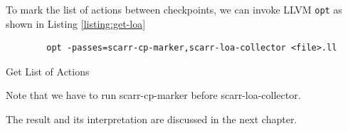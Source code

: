 To mark the list of actions between checkpoints, we can invoke LLVM \texttt{opt} as shown in Listing \ref{listing:get-loa}

\begin{listing}
    \begin{verbatim}
        opt -passes=scarr-cp-marker,scarr-loa-collector <file>.ll
    \end{verbatim}
    \caption{Get List of Actions}    
    \label{listing:get-loa}
\end{listing}

Note that we have to run scarr-cp-marker before scarr-loa-collector.

The result and its interpretation are discussed in the next chapter.